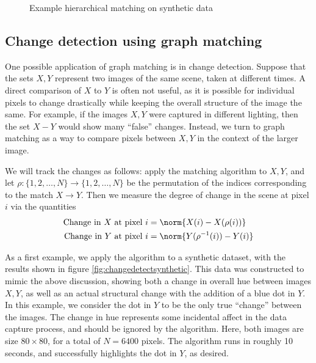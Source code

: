 \documentclass{article}[11pt]
\begin{document}
\begin{figure}
{    \label{fig:CoarseMatchX2}%
  }%
  \caption{Example hierarchical matching on synthetic data}
  \label{fig:graphmatchsynthetic}
\end{figure}

\subsection{Change detection using graph matching}

One possible application of graph matching is in change detection. Suppose that the sets $X,Y$ represent two images of the same scene, taken at different times. A direct comparison of $X$ to $Y$ is often not useful, as it is possible for individual pixels to change drastically while keeping the overall structure of the image the same. For example, if the images $X,Y$ were captured in different lighting, then the set $X-Y$ would show many ``false'' changes. Instead, we turn to graph matching as a way to compare pixels between $X,Y$ in the context of the larger image.

We will track the changes as follows: apply the matching algorithm to $X,Y$, and let $\rho:\{1,2,\ldots,N\} \to \{1,2,\ldots,N\}$ be the permutation of the indices corresponding to the match $X \to Y$. Then we measure the degree of change in the scene at pixel $i$ via the quantities
\begin{align}
  \text{Change in $X$ at pixel $i$} &= \norm{X(i) - X(\rho(i))} \\
  \text{Change in $Y$ at pixel $i$} &= \norm{Y(\rho^{-1}(i)) - Y(i)}
\end{align}

As a first example, we apply the algorithm to a synthetic dataset, with the results shown in figure \ref{fig:changedetectsynthetic}. This data was constructed to mimic the above discussion, showing both a change in overall hue between images $X, Y$, as well as an actual structural change with the addition of a blue dot in $Y$. In this example, we consider the dot in $Y$ to be the only true ``change'' between the images. The change in hue represents some incidental affect in the data capture process, and should be ignored by the algorithm. Here, both images are size $80 \times 80$, for a total of $N = 6400$ pixels. The algorithm runs in roughly 10 seconds, and successfully highlights the dot in $Y$, as desired.
\end{document}
